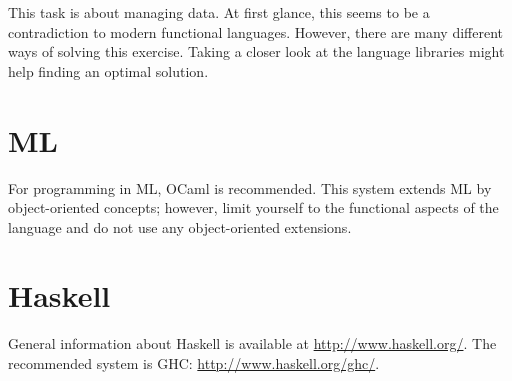 \documentclass[a4paper,10pt]{article}
\begin{document}
This task is about managing data. At first glance, this seems to be a
contradiction to modern functional languages. However, there are
many different ways of solving this exercise. Taking a closer look
at the language libraries might help finding an optimal solution.

\section{ML}

For programming in ML, OCaml is recommended. This system extends
ML by object-oriented concepts; however, limit yourself to the
functional aspects of the language and do not use any object-oriented
extensions.

\section{Haskell}

General information about Haskell is available at \url{
http://www.haskell.org/}. The recommended system is GHC: \url{http://www.haskell.org/ghc/}.
\end{document}

